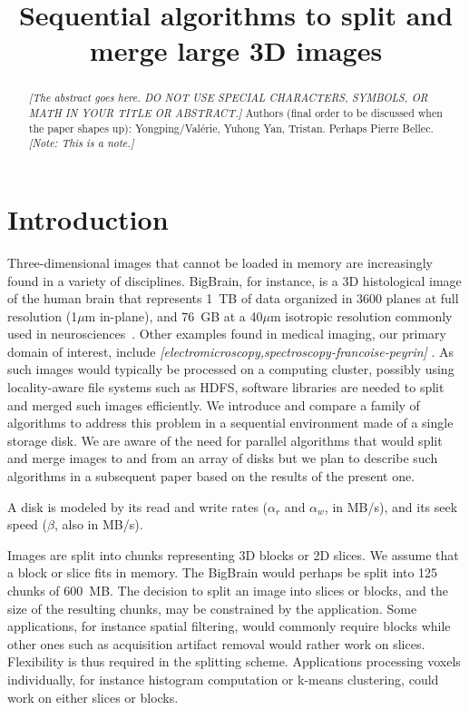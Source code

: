 \documentclass[10pt, conference, compsocconf]{IEEEtran}
\newcommand{\todo}[1]{
  \color{red}\emph{[#1]}
  \color{black}
}
\newcommand{\note}[1]{
  \color{blue}\emph{[Note: #1]}
  \color{black}
}
\begin{document}
\title{Sequential algorithms to split and merge large 3D images}

\maketitle

\begin{abstract}
  \todo{The abstract goes here. DO NOT USE SPECIAL CHARACTERS,
    SYMBOLS, OR MATH IN YOUR TITLE OR ABSTRACT.}  Authors (final order
  to be discussed when the paper shapes up): Yongping/Val\'erie,
  Yuhong Yan, Tristan. Perhaps Pierre Bellec. \note{This is a note.}
\end{abstract}


\section{Introduction}

Three-dimensional images that cannot be loaded in memory are
increasingly found in a variety of disciplines. BigBrain, for
instance, is a 3D histological image of the human brain that
represents 1~TB of data organized in 3600 planes at full resolution
(1$\mu$m in-plane), and 76~GB at a 40$\mu$m isotropic resolution
commonly used in neurosciences~\cite{amunts2013bigbrain}. Other
examples found in medical imaging, our primary domain of interest,
include \todo{electromicroscopy,spectroscopy-francoise-peyrin}. As
such images would typically be processed on a computing cluster,
possibly using locality-aware file systems such as HDFS, software
libraries are needed to split and merged such images efficiently. We
introduce and compare a family of algorithms to address this problem
in a sequential environment made of a single storage disk. We are
aware of the need for parallel algorithms that would split and merge
images to and from an array of disks but we plan to describe such
algorithms in a subsequent paper based on the results of the present
one.

A disk is modeled by its read and write rates ($\alpha_r$ and
$\alpha_w$, in MB/s), and its seek speed ($\beta$, also in
MB/s).

Images are split into chunks representing 3D blocks or 2D slices. We
assume that a block or slice fits in memory. The BigBrain would
perhaps be split into 125 chunks of 600~MB. The decision to split an
image into slices or blocks, and the size of the resulting chunks, may
be constrained by the application. Some applications, for instance
spatial filtering, would commonly require blocks while other ones such
as acquisition artifact removal would rather work on
slices. Flexibility is thus required in the splitting
scheme. Applications processing voxels individually, for instance
histogram computation or k-means clustering, could work on either
slices or blocks.
\end{document}
